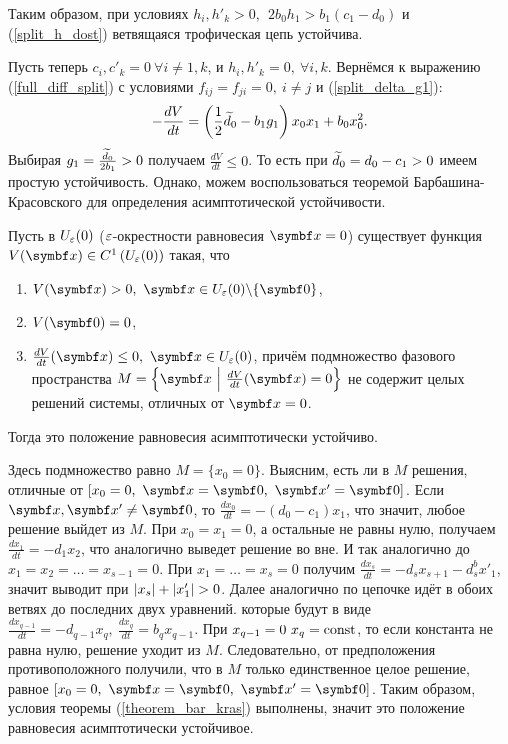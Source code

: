 Таким образом, при условиях \(h_i, h'_k > 0, ~~ 2 b_0 h_1 > b_1 (c_1 - d_0)\) и (\ref{split_h_dost}) ветвящаяся трофическая цепь устойчива.

Пусть теперь \(c_i, c'_k = 0 ~ \forall i \neq 1, k \), и \(h_i, h'_k = 0, ~ \forall i, k \). Вернёмся к выражению (\ref{full_diff_split}) с условиями \(f_{ij} = f_{ji} = 0, ~ i \neq j\) и (\ref{split_delta_g1}):
\begin{equation}
    - \frac{dV}{dt} = \left( \frac{1}{2} \widetilde{d}_0 - b_1 g_1 \right) x_0 x_1 + b_0 x_0^2.
\end{equation}
Выбирая \(g_1 = \frac{\widetilde{d}_0}{2 b_1} > 0\) получаем \(\frac{dV}{dt} \leq 0\). То есть при \(\widetilde{d}_0 = d_0 - c_1 > 0\) имеем простую устойчивость. Однако, можем воспользоваться теоремой Барбашина-Красовского\cite{barabashin_stability} для определения асимптотической устойчивости.

\begin{theorem} \label{theorem_bar_kras}
    Пусть в \(U_\varepsilon(0)\) (\(\varepsilon\)-окрестности равновесия \(\mb{x} = 0\)) существует функция \(V(\mb{x}) \in C^1\left( U_\veps(0) \right)\) такая, что
    \begin{enumerate}
        \item \(V(\mb{x}) > 0, ~ \mb{x} \in U_\veps(0) \backslash \{\mb{0}\}\),
        \item \(V(\mb{0}) = 0\),
        \item \(\frac{dV}{dt}(\mb{x}) \leq 0, ~ \mb{x} \in U_\veps(0) \), причём подмножество фазового пространства \( M = \left\{ \mb{x} ~ \Big\vert ~ \frac{dV}{dt}(\mb{x}) = 0 \right\} \) не содержит целых решений системы, отличных от \(\mb{x} = 0\).
    \end{enumerate}
    Тогда это положение равновесия асимптотически устойчиво.
\end{theorem}

Здесь подмножество равно \( M = \{ x_0 = 0 \} \). Выясним, есть ли в \(M\) решения, отличные от \( [x_0 = 0, ~ \mb{x} = \mb{0}, ~ \mb{x'} = \mb{0}] \). Если \( \mb{x}, \mb{x'} \neq \mb{0} \), то \(\frac{dx_0}{dt} = -(d_0 - c_1) x_1\), что значит, любое решение выйдет из \(M\). При \(x_0 = x_1 = 0\), а остальные не равны нулю, получаем \(\frac{dx_1}{dt} = -d_1 x_2\), что аналогично выведет решение во вне. И так аналогично до \( x_1 = x_2 = \dots = x_{s-1} = 0 \). При \(x_1 = \dots = x_{s} = 0\) получим \( \frac{d x_s}{dt} = -d_{s} x_{s+1} - d^b_s x'_1 \), значит выводит при \( \left\vert x_s \right\vert + \left\vert x'_1 \right\vert > 0\). Далее аналогично по цепочке идёт в обоих ветвях до последних двух уравнений. которые будут в виде \(\frac{dx_{q-1}}{dt} = -d_{q-1} x_q, ~ \frac{d x_q}{dt} = b_q x_{q-1}\). При \(x_{q-1} = 0 ~ x_q = \operatorname{const} \), то если константа не равна нулю, решение уходит из \(M\). Следовательно, от предположения противоположного получили, что в \(M\) только единственное целое решение, равное \( [x_0 = 0, ~ \mb{x} = \mb{0}, ~ \mb{x'} = \mb{0}] \). Таким образом, условия теоремы (\ref{theorem_bar_kras}) выполнены, значит это положение равновесия асимптотически устойчивое.


